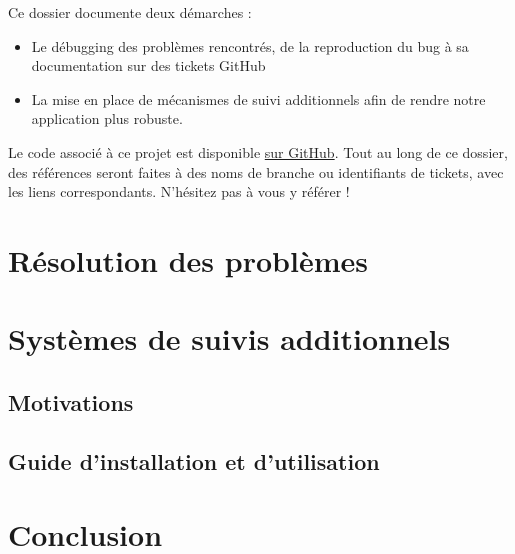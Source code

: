\documentclass[french]{article}
\begin{document}
    Ce dossier documente deux démarches :
    \begin{itemize}
        \item Le débugging des problèmes rencontrés, de la reproduction du bug à sa documentation sur des tickets GitHub
        \item La mise en place de mécanismes de suivi additionnels afin de rendre notre application plus robuste.
    \end{itemize}
    Le code associé à ce projet est disponible \href{https://github.com/vinpap/mathfinder}{sur GitHub}. Tout au long de ce dossier, des références seront faites à des noms de branche ou identifiants de tickets, avec les liens correspondants. N'hésitez pas à vous y référer !

    \section{Résolution des problèmes}

    \section{Systèmes de suivis additionnels}
    \subsection{Motivations}
    \subsection{Guide d'installation et d'utilisation}

    \section{Conclusion}
\end{document}
